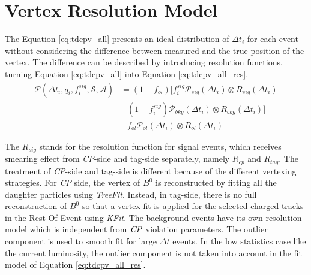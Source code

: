 \section{Vertex Resolution Model}

The Equation \ref{eq:tdcpv_all} presents an ideal distribution of $\Delta t_i$ for each event without considering the difference between measured and the true position of the vertex. The difference can be described by introducing resolution functions, turning Equation \ref{eq:tdcpv_all} into Equation \ref{eq:tdcpv_all_res}.
\begin{equation}\label{eq:tdcpv_all_res}
\begin{split}
\mathcal{P}(\Delta t_i,q_i,f_i^{sig},\mathcal{S},\mathcal{A})
&=(1-f_{ol})\text{[}f^{sig}_i\mathcal{P}_{sig}(\Delta t_i)\otimes R_{sig}(\Delta t_i)\\
&+(1-f^{sig}_i)\mathcal{P}_{bkg}(\Delta t_i)\otimes R_{bkg}(\Delta t_i)
\text{]}\\
&+f_{ol}\mathcal{P}_{ol}(\Delta t_i)\otimes R_{ol}(\Delta t_i)
\end{split}
\end{equation}

The $R_{sig}$ stands for the resolution function for signal events, which receives smearing effect from \textit{CP}-side and tag-side separately, namely $R_{cp}$ and  $R_{tag}$. The treatment of \textit{CP}-side and tag-side is different because of the different vertexing strategies. For \textit{CP} side, the vertex of $B^0$ is reconstructed by fitting all the daughter particles using \textit{TreeFit}. Instead, in tag-side, there is no full reconstruction of $B^0$ so that a vertex fit is applied for the selected charged tracks in the Rest-Of-Event using \textit{KFit}. The background events have its own resolution model which is independent from  $\it{CP}$ violation parameters. The outlier component is used to smooth fit for large $\Delta t$ events. In the low statistics case like the current luminosity, the outlier component is not taken into account in the fit model of Equation \ref{eq:tdcpv_all_res}.

